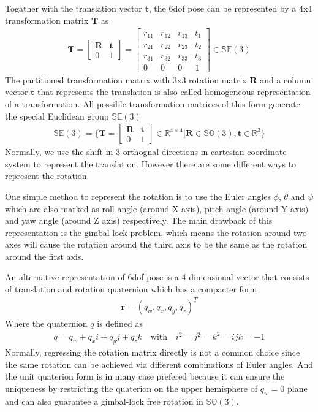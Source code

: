 \documentclass[12pt,DIV14,BCOR12mm,a4paper,footinclude=false,headinclude,parskip=half-,twoside,openright,cleardoublepage=empty,toc=index,bibliography=totoc,listof=totoc]{scrreprt}
\numberwithin{equation}{chapter}
\begin{document}
Togather with the translation vector $\mathbf{t}$, the \gls{6dof} pose can be represented by a 4x4 transformation matrix $\mathbf{T}$ as
\begin{align}
  \mathbf{T} = \begin{bmatrix}
    \mathbf{R} & \mathbf{t} \\
    0 & 1
  \end{bmatrix}
  = \begin{bmatrix}
    r_{11} & r_{12} & r_{13} & t_{1} \\
    r_{21} & r_{22} & r_{23} & t_{2} \\
    r_{31} & r_{32} & r_{33} & t_{3} \\
    0 & 0 & 0 & 1
  \end{bmatrix}
  \in \mathbb{S} \mathbb{E} (3)
\end{align}
The partitioned transformation matrix with 3x3 rotation matrix $\mathbf{R}$ and a column vector $\mathbf{t}$ that represents the translation is also called homogeneous representation of a transformation. All possible transformation matrices of this form generate the special Euclidean group $\mathbb{S} \mathbb{E} (3)$
\begin{align}
  \mathbb{S} \mathbb{E} (3) = \{\mathbf{T} = \begin{bmatrix}
    \mathbf{R} & \mathbf{t} \\
    0 & 1
  \end{bmatrix}\in \mathbb{R}^{4 \times 4}| \mathbf{R} \in \mathbb{S} \mathbb{O} (3), \mathbf{t} \in \mathbb{R}^{3} \}
\end{align}
Normally, we use the shift in 3 orthognal directions in cartesian coordinate system to represent the translation. However there are some different ways to represent the rotation.

One simple method to represent the rotation is to use the Euler angles $\phi$, $\theta$ and $\psi$ which are also marked as roll angle (around X axis), pitch angle (around Y axis) and yaw angle (around Z axis) respectively. The main drawback of this representation is the gimbal lock problem, which means the rotation around two axes will cause the rotation around the third axis to be the same as the rotation around the first axis.

An alternative representation of \gls{6dof} pose is a 4-dimensional vector that consists of translation and rotation quaternion which has a compacter form
\begin{align}
  \mathbf{r} = (q_{w}, q_{x}, q_{y}, q_{z})^{T}
\end{align}
Where the quaternion $q$ is defined as
\begin{align}
  q = q_{w} + q_{x}i + q_{y}j + q_{z}k \quad \textrm{with} \quad i^{2} = j^{2} = k^{2} = ijk = -1
\end{align}
Normally, regressing the rotation matrix directly is not a common choice since the same rotation can be achieved via different combinations of Euler angles. And the unit quaterion form is in many case prefered because it can ensure the uniqueness by restricting the quaterion on the upper hemisphere of $q_{w}=0$ plane and can also guarantee a gimbal-lock free rotation in $\mathbb{S} \mathbb{O} (3)$\cite{9231126}. 
\end{document}
